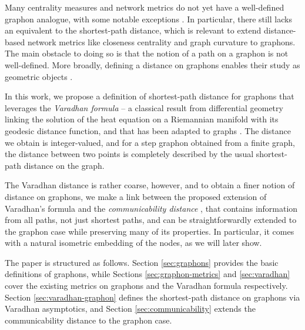 \documentclass[11pt]{article}
\theoremstyle{definition}
\begin{document}
Many centrality measures and network metrics do not yet have a well-defined graphon analogue, with some notable exceptions \cite{AvellaMedinaCentralities2020,GaoFixedPointCentrality2022,klimmModularityMaximizationGraphons2022}. In particular, there still lacks an equivalent to the shortest-path distance, which is relevant to extend distance-based network metrics like closeness centrality \cite{BavelasCloseness1950,Sabidussi_1966} and graph curvature \cite{ollivierRicciCurvatureMarkov2009, linRicciCurvatureGraphs2011,vanderhoornOllivierRicciCurvatureConvergence2021} to graphons. The main obstacle to doing so is that the notion of a path on a graphon is not well-defined. More broadly, defining a distance on graphons enables their study as geometric objects \cite{lovaszRegularityPartitionsTopology2010b,lovaszSzemerediLemmaAnalyst2007a,lovaszAutomorphismGroupGraphon2014b}.

In this work, we propose a definition of shortest-path distance for graphons that leverages the \textit{Varadhan formula} \cite{varadhanBehaviorFundamentalSolution1967,varadhanDiffusionProcessesSmall1967} -- a classical result from differential geometry linking the solution of the heat equation on a Riemannian manifold with its geodesic distance function, and that has been adapted to graphs \cite{kellerNoteShorttimeBehavior2016,steinerbergerVaradhanAsymptoticsHeat2019}. The distance we obtain is integer-valued, and for a step graphon obtained from a finite graph, the distance between two points is completely described by the usual shortest-path distance on the graph.

The Varadhan distance is rather coarse, however, and to obtain a finer notion of distance on graphons, we make a link between the proposed extension of Varadhan's formula and the \textit{communicability distance} \cite{estradaCommunicabilityDistanceGraphs2012}, that contains information from all paths, not just shortest paths, and can be straightforwardly extended to the graphon case while preserving many of its properties. In particular, it comes with a natural isometric embedding of the nodes, as we will later show.

The paper is structured as follows. Section \ref{sec:graphons} provides the basic definitions of graphons, while Sections \ref{sec:graphon-metrics} and \ref{sec:varadhan} cover the existing metrics on graphons and the Varadhan formula respectively. Section \ref{sec:varadhan-graphon} defines the shortest-path distance on graphons via Varadhan asymptotics, and Section \ref{sec:communicability} extends the communicability distance to the graphon case.
\end{document}
